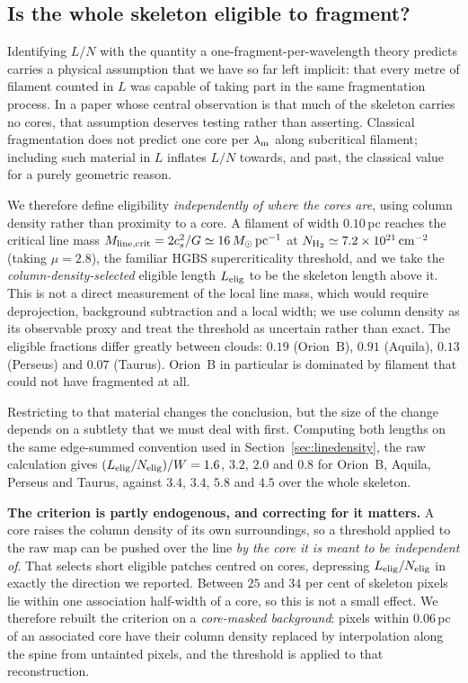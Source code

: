 \documentclass[usenatbib,twoside,twocolumn]{mnras}
\begin{document}
\subsection{Is the whole skeleton eligible to fragment?}
\label{sec:eligible}
Identifying $L/N$ with the quantity a one-fragment-per-wavelength theory predicts carries a physical assumption that we have so far left implicit: that every metre of filament counted in $L$ was capable of taking part in the same fragmentation process. In a paper whose central observation is that much of the skeleton carries no cores, that assumption deserves testing rather than asserting. Classical fragmentation does not predict one core per $\lambda_{\rm m}$ along subcritical filament; including such material in $L$ inflates $L/N$ towards, and past, the classical value for a purely geometric reason.

We therefore define eligibility \emph{independently of where the cores are}, using column density rather than proximity to a core. A filament of width $0.10$\,pc reaches the critical line mass $M_{\rm line,crit}=2c_s^2/G\simeq16\,M_\odot\,{\rm pc^{-1}}$ at $N_{\rm H_2}\simeq7.2\times10^{21}\,{\rm cm^{-2}}$ (taking $\mu=2.8$), the familiar HGBS supercriticality threshold, and we take the \emph{column-density-selected} eligible length $L_{\rm elig}$ to be the skeleton length above it. This is not a direct measurement of the local line mass, which would require deprojection, background subtraction and a local width; we use column density as its observable proxy and treat the threshold as uncertain rather than exact. The eligible fractions differ greatly between clouds: $0.19$ (Orion~B), $0.91$ (Aquila), $0.13$ (Perseus) and $0.07$ (Taurus). Orion~B in particular is dominated by filament that could not have fragmented at all.

Restricting to that material changes the conclusion, but the size of the change depends on a subtlety that we must deal with first. Computing both lengths on the same edge-summed convention used in Section~\ref{sec:linedensity}, the raw calculation gives $(L_{\rm elig}/N_{\rm elig})/W=1.6$, $3.2$, $2.0$ and $0.8$ for Orion~B, Aquila, Perseus and Taurus, against $3.4$, $3.4$, $5.8$ and $4.5$ over the whole skeleton.

\smallskip\noindent\textbf{The criterion is partly endogenous, and correcting for it matters.} A core raises the column density of its own surroundings, so a threshold applied to the raw map can be pushed over the line \emph{by the core it is meant to be independent of}. That selects short eligible patches centred on cores, depressing $L_{\rm elig}/N_{\rm elig}$ in exactly the direction we reported. Between $25$ and $34$ per cent of skeleton pixels lie within one association half-width of a core, so this is not a small effect. We therefore rebuilt the criterion on a \emph{core-masked background}: pixels within $0.06$\,pc of an associated core have their column density replaced by interpolation along the spine from untainted pixels, and the threshold is applied to that reconstruction.
\end{document}
